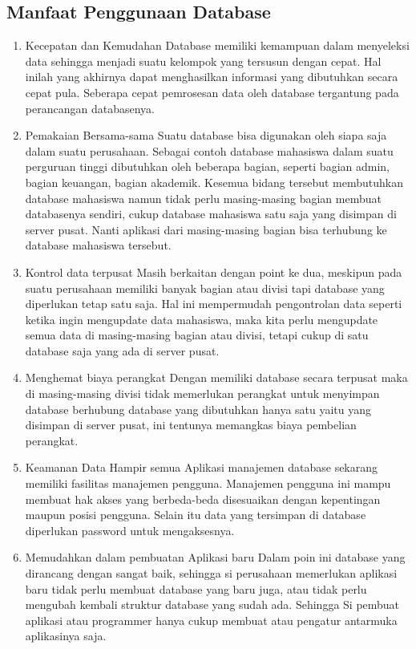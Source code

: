 \subsection {Manfaat Penggunaan Database}
	\begin{enumerate}
		\item Kecepatan dan Kemudahan
		      Database memiliki kemampuan dalam menyeleksi data sehingga menjadi suatu kelompok yang tersusun dengan cepat. Hal inilah yang akhirnya dapat menghasilkan informasi yang dibutuhkan secara cepat pula. Seberapa cepat pemrosesan data oleh database tergantung pada perancangan databasenya.
     
		\item Pemakaian Bersama-sama
		      Suatu database bisa digunakan oleh siapa saja dalam suatu perusahaan. Sebagai contoh database mahasiswa dalam suatu perguruan tinggi dibutuhkan oleh beberapa bagian, seperti bagian admin, bagian keuangan, bagian akademik. Kesemua bidang tersebut membutuhkan database mahasiswa namun tidak perlu masing-masing bagian membuat databasenya sendiri, cukup database mahasiswa satu saja yang disimpan di server pusat. Nanti aplikasi dari masing-masing bagian bisa terhubung ke database mahasiswa tersebut. 
			
		\item Kontrol data terpusat 
		      Masih berkaitan dengan point ke dua, meskipun pada suatu perusahaan memiliki banyak bagian atau divisi tapi database yang diperlukan tetap satu saja. Hal ini mempermudah pengontrolan data seperti ketika ingin mengupdate data mahasiswa, maka kita perlu mengupdate semua data di masing-masing bagian atau divisi, tetapi cukup di satu database saja yang ada di server pusat. 
		
		\item Menghemat biaya perangkat
		      Dengan memiliki database secara terpusat maka di masing-masing divisi tidak memerlukan perangkat untuk menyimpan database berhubung database yang dibutuhkan hanya satu yaitu yang disimpan di server pusat, ini tentunya memangkas biaya pembelian perangkat.
 
		\item Keamanan Data 
		      Hampir semua Aplikasi manajemen database sekarang memiliki fasilitas manajemen pengguna. Manajemen pengguna ini mampu membuat hak akses yang berbeda-beda disesuaikan dengan kepentingan maupun posisi pengguna. Selain itu data yang tersimpan di database diperlukan password untuk mengaksesnya. 
		      
		\item Memudahkan dalam pembuatan Aplikasi baru 
		      Dalam poin ini database yang dirancang dengan sangat baik, sehingga si perusahaan memerlukan aplikasi baru tidak perlu membuat database yang baru juga, atau tidak perlu mengubah kembali struktur database yang sudah ada. Sehingga Si pembuat aplikasi atau programmer hanya cukup membuat atau pengatur antarmuka aplikasinya saja.
	\end{enumerate}

